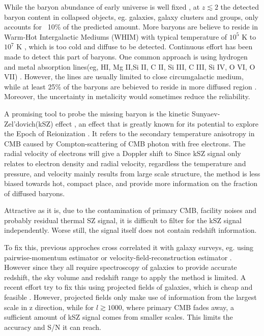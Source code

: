 While the baryon abundance of early universe is well fixed 
\cite{Cooke14,Fukugita98,Komatsu11,Hinshaw13}, 
at $z\lesssim 2$ the detected baryon content in collapsed
objects, eg. galaxies, galaxy clusters and groups, only accounts for ~10$\%$ of the predicted amount.
More baryons are believe to reside in Warm-Hot Intergalactic Mediums (WHIM) with typical temperature of $10^5$ K to $10^7$ K \cite{Pen1999}\cite{Soltan06}, which is too cold and diffuse to be detected.
Continuous effort has been made to detect this part of baryons. 
One common approach is using hydrogen and metal absorption lines(eg, HI, Mg II,Si II, C II, Si III, C III, Si IV, O VI, O VII) \cite{Fukugita04}\cite{Werk14}.
However, the lines are usually limited to close circumgalactic medium, while at least 25\% of the baryons are bebieved to reside in more diffused region \cite{Dave10}. Moreover, the uncertainty in metalicity would sometimes reduce the reliability.

A promising tool to probe the missing baryon is the kinetic Sunyaev-Zel'dovich(kSZ) effect \cite{Sunyaev72}\cite{Sunyaev80}, 
  an effect that is greatly known for its potential to explore the Epoch of Reionization \cite{Zhang04}\cite{McQuinn05}\cite{Zahn12}. 
It refers to the secondary temperature anisotropy in CMB caused by Compton-scattering of CMB photon with free electrons. 
The radial velocity of electrons will give a Doppler shift to 
Since kSZ signal only relates to electron density and radial velocity, 
regardless the temperature and pressure,  
and velocity mainly results from large scale structure, 
the method is less biased towards hot, compact place, 
and provide more information on the fraction of diffused baryons.

Attractive as it is, 
due to the contamination of primary CMB, facility noises and probably residual thermal SZ signal, 
it is difficult to filter for the kSZ signal independently. 
Worse still, the signal itself does not contain redshift information.

To fix this, previous approches cross correlated it with galaxy surveys, 
eg. using pairwise-momentum estimator \cite{Hand12} or velocity-field-reconstruction estimator \cite{Shao11}\cite{Li14}. 
However since they all require spectroscopy of galaxies to provide accurate redshift, the sky volume and redshift range to apply the method is limited. 
A recent effort try to fix this using projected fields of galaxies, which is cheap and feasible \cite{Hill16}. 
However, projected fields only make use of information from the largest scale in z direction, 
while for $l\gtrsim1000$, where primary CMB fades away, a sufficient amount of kSZ signal comes from smaller scales. 
This limits the accuracy and S/N it can reach.


